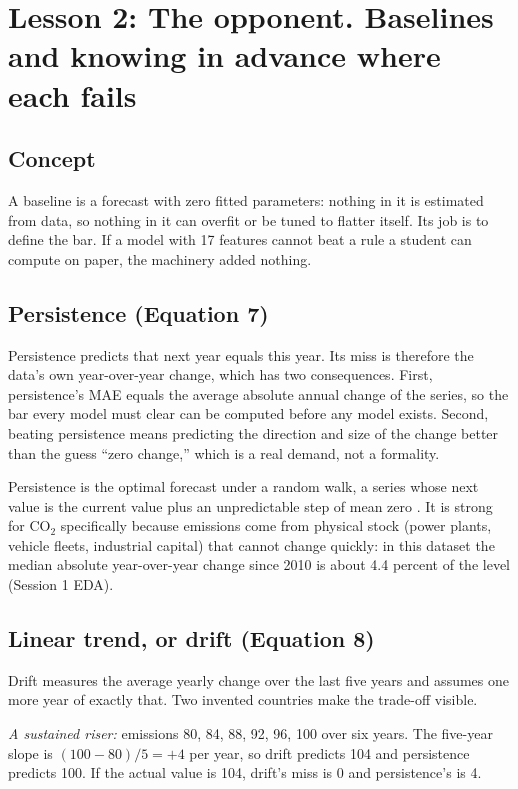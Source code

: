 \documentclass[11pt]{article}
\begin{document}
\section{Lesson 2: The opponent. Baselines and knowing in advance where each fails}

\subsection{Concept}

A baseline is a forecast with zero fitted parameters: nothing in it is
estimated from data, so nothing in it can overfit or be tuned to flatter
itself. Its job is to define the bar. If a model with 17 features cannot
beat a rule a student can compute on paper, the machinery added nothing.

\subsection{Persistence (Equation 7)}

Persistence predicts that next year equals this year. Its miss is
therefore the data's own year-over-year change, which has two
consequences. First, persistence's MAE equals the average absolute annual
change of the series, so the bar every model must clear can be computed
before any model exists. Second, beating persistence means predicting the
direction and size of the change better than the guess ``zero change,''
which is a real demand, not a formality.

Persistence is the optimal forecast under a random walk, a series whose
next value is the current value plus an unpredictable step of mean zero
\cite{hyndman2021forecasting}. It is strong for CO$_2$ specifically
because emissions come from physical stock (power plants, vehicle fleets,
industrial capital) that cannot change quickly: in this dataset the
median absolute year-over-year change since 2010 is about 4.4 percent of
the level (Session 1 EDA).

\subsection{Linear trend, or drift (Equation 8)}

Drift measures the average yearly change over the last five years and
assumes one more year of exactly that. Two invented countries make the
trade-off visible.

\emph{A sustained riser:} emissions 80, 84, 88, 92, 96, 100 over six
years. The five-year slope is $(100-80)/5 = +4$ per year, so drift
predicts 104 and persistence predicts 100. If the actual value is 104,
drift's miss is 0 and persistence's is 4.
\end{document}
